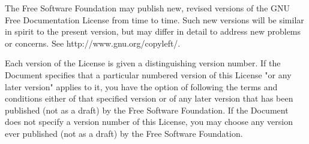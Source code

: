 The Free Software Foundation may publish new, revised versions
of the GNU Free Documentation License from time to time.  Such new
versions will be similar in spirit to the present version, but may
differ in detail to address new problems or concerns. See
http://www.gnu.org/copyleft/.

Each version of the License is given a distinguishing version number.
If the Document specifies that a particular numbered version of this
License "or any later version" applies to it, you have the option of
following the terms and conditions either of that specified version or
of any later version that has been published (not as a draft) by the
Free Software Foundation.  If the Document does not specify a version
number of this License, you may choose any version ever published (not
as a draft) by the Free Software Foundation.


